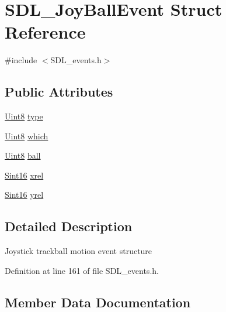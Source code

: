 \hypertarget{struct_s_d_l___joy_ball_event}{}\section{S\+D\+L\+\_\+\+Joy\+Ball\+Event Struct Reference}
\label{struct_s_d_l___joy_ball_event}


{\ttfamily \#include $<$S\+D\+L\+\_\+events.\+h$>$}

\subsection*{Public Attributes}
\begin{DoxyCompactItemize}
\item 
\hyperlink{_s_d_l__stdinc_8h_a2944638813a090aa23e62f4da842c3e2}{Uint8} \hyperlink{struct_s_d_l___joy_ball_event_aa2c2e84ae1814f280dcc4ec37feb8ce3}{type}
\item 
\hyperlink{_s_d_l__stdinc_8h_a2944638813a090aa23e62f4da842c3e2}{Uint8} \hyperlink{struct_s_d_l___joy_ball_event_ae23a3dc77c0f327ec3597e68a4fa02ab}{which}
\item 
\hyperlink{_s_d_l__stdinc_8h_a2944638813a090aa23e62f4da842c3e2}{Uint8} \hyperlink{struct_s_d_l___joy_ball_event_add4eb0daeaf95ae56e8c7cfcec560242}{ball}
\item 
\hyperlink{_s_d_l__stdinc_8h_a9d0257032c0e146ab6121bf0122712f5}{Sint16} \hyperlink{struct_s_d_l___joy_ball_event_a959a8473aa1964e5e1778c27a9ffd261}{xrel}
\item 
\hyperlink{_s_d_l__stdinc_8h_a9d0257032c0e146ab6121bf0122712f5}{Sint16} \hyperlink{struct_s_d_l___joy_ball_event_a28ad48a9eb7a5d3ff62ccba09fcead76}{yrel}
\end{DoxyCompactItemize}


\subsection{Detailed Description}
Joystick trackball motion event structure 

Definition at line 161 of file S\+D\+L\+\_\+events.\+h.



\subsection{Member Data Documentation}
\hypertarget{struct_s_d_l___joy_ball_event_add4eb0daeaf95ae56e8c7cfcec560242}{}
